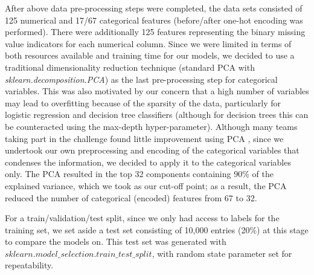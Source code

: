 \documentclass{article}
\begin{document}
After above data pre-processing steps were completed, the data sets consisted of 125 numerical and 17/67 categorical features (before/after one-hot encoding was performed).
There were additionally 125 features representing the binary missing value indicators for each numerical column.
Since we were limited in terms of both resources available and training time for our models, we decided to use a traditional dimensionality reduction technique (standard PCA with \emph{sklearn.decomposition.PCA}) as the last pre-processing step for categorical variables.
This was also motivated by our concern that a high number of variables may lead to overfitting because of the sparsity of the data, particularly for logistic regression and decision tree classifiers (although for decision trees this can be counteracted using the max-depth hyper-parameter).
Although many teams taking part in the challenge found little improvement using PCA \cite{guyon2009analysis}, since we undertook our own preprocessing and encoding of the categorical variables that condenses the information, we decided to apply it to the categorical variables only.
The PCA resulted in the top 32 components containing 90\% of the explained variance, which we took as our cut-off point; as a result, the PCA reduced the number of categorical (encoded) features from 67 to 32.

For a train/validation/test split, since we only had access to labels for the training set, we set aside a test set consisting of 10,000 entries (20\%) at this stage to compare the models on.
This test set was generated with $sklearn.model\_selection.train\_test\_split$, with random state parameter set for repeatability.

\end{document}
